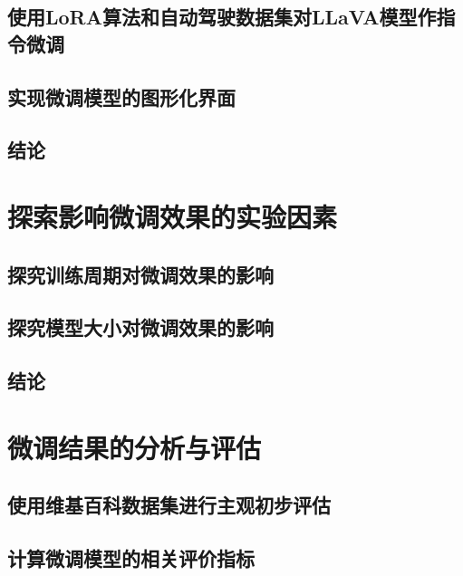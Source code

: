 \documentclass[
    linespread = 1.25
]{ctexart}
\begin{document}

\subsection{使用LoRA算法和自动驾驶数据集对LLaVA模型作指令微调}

\subsection{实现微调模型的图形化界面}

\subsection{结论}

\section{探索影响微调效果的实验因素}

\subsection{探究训练周期对微调效果的影响}

\subsection{探究模型大小对微调效果的影响}

\subsection{结论}

\section{微调结果的分析与评估}

\subsection{使用维基百科数据集进行主观初步评估}

\subsection{计算微调模型的相关评价指标}
\end{document}
